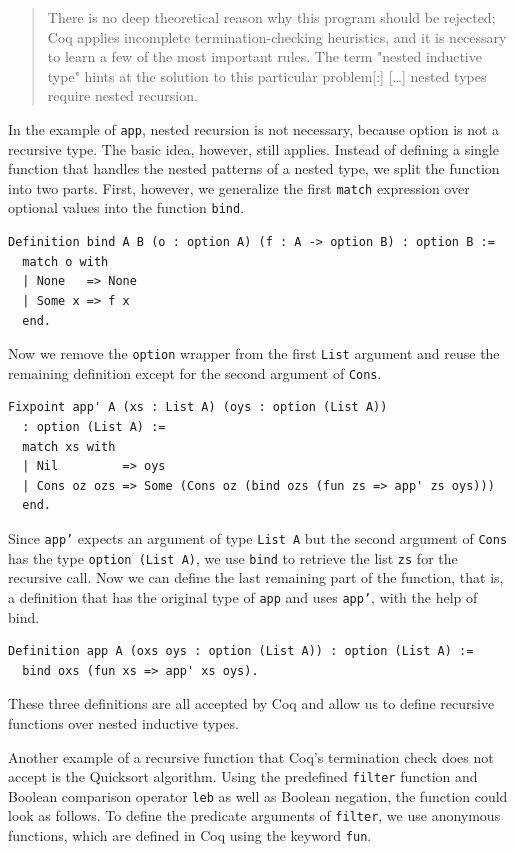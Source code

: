\documentclass[a4paper, 11pt, fleqn, twoside]{scrreprt}
\newcommand{\cinl}[1]{\texttt{#1}}
\begin{document}
\begin{quotation}
\noindent
There is no deep theoretical reason why this program should be rejected; Coq applies incomplete termination-checking heuristics, and it is necessary to learn a few of the most important rules. The term "nested inductive type" hints at the solution to this particular problem[:] [\dots{}] nested types require nested recursion.
\end{quotation}

In the example of \cinl{app}, nested recursion is not necessary, because option is not a recursive type.
The basic idea, however, still applies.
Instead of defining a single function that handles the nested patterns of a nested type, we split the function into two parts.
First, however, we generalize the first \cinl{match} expression over optional values into the function \cinl{bind}.

\begin{verbatim}
Definition bind A B (o : option A) (f : A -> option B) : option B :=
  match o with
  | None   => None
  | Some x => f x
  end.
\end{verbatim}

Now we remove the \cinl{option} wrapper from the first \cinl{List} argument and reuse the remaining definition except for the second argument of \cinl{Cons}.

\begin{verbatim}
Fixpoint app' A (xs : List A) (oys : option (List A)) 
  : option (List A) :=
  match xs with
  | Nil         => oys
  | Cons oz ozs => Some (Cons oz (bind ozs (fun zs => app' zs oys)))
  end.
\end{verbatim}

Since \cinl{app'} expects an argument of type \cinl{List A} but the second argument of \cinl{Cons} has the type \cinl{option (List A)}, we use \cinl{bind} to retrieve the list \cinl{zs} for the recursive call.
Now we can define the last remaining part of the function, that is, a definition that has the original type of \cinl{app} and uses \cinl{app'}, with the help of bind.

\begin{verbatim}
Definition app A (oxs oys : option (List A)) : option (List A) :=
  bind oxs (fun xs => app' xs oys).
\end{verbatim}

These three definitions are all accepted by Coq and allow us to define recursive functions over nested inductive types.

Another example of a recursive function that Coq's termination check does not accept is the Quicksort algorithm.
Using the predefined \cinl{filter} function and Boolean comparison operator \cinl{leb} as well as Boolean negation, the function could look as follows.
To define the predicate arguments of \cinl{filter}, we use anonymous functions, which are defined in Coq using the keyword \cinl{fun}.
\end{document}
